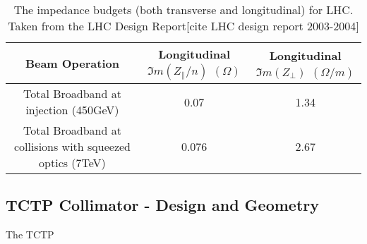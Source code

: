\begin{table}
\caption{The impedance budgets (both transverse and longitudinal) for LHC. Taken from the LHC Design Report[cite LHC design report 2003-2004]}
\begin{center}
\begin{tabular}{c | c | c}
Beam Operation & Longitudinal $\Im{}m ( Z_{\parallel}/n )$ $( \Omega )$ & Longitudinal $\Im{}m ( Z_{\perp} )$ $( \Omega /m )$\\ \hline
Total Broadband at injection (450GeV) & 0.07 & 1.34 \\ \hline
Total Broadband at collisions with squeezed optics (7TeV) & 0.076 & 2.67 \\ \hline
\end{tabular}
\end{center}
\label{tab:lhc-impedance-budget}
\end{table}


\subsection{TCTP Collimator - Design and Geometry}

The TCTP 